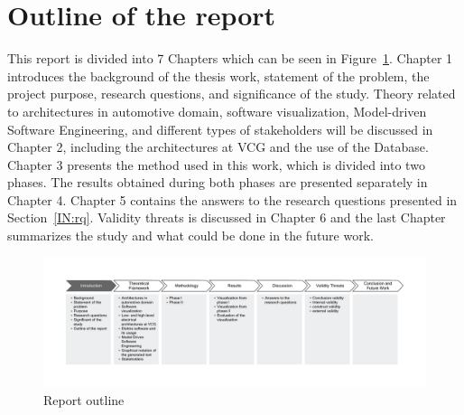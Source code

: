 \section{Outline of the report} \label{Outline_ref}
This report is divided into 7 Chapters which can be seen in Figure~\ref{fig:report_outline}. Chapter 1 introduces the background of the thesis work, statement of the problem, the project purpose, research questions, and significance of the study. Theory related to architectures in automotive domain, software visualization, Model-driven Software Engineering, and different types of stakeholders will be discussed in Chapter 2, including the architectures at VCG and the use of the Database. Chapter 3 presents the method used in this work, which is divided into two phases. The results obtained during both phases are presented separately in Chapter 4. Chapter 5 contains the answers to the research questions presented in Section~\ref{IN:rq}. Validity threats is discussed in Chapter 6 and the last Chapter summarizes the study and what could be done in the future work.

\begin{figure}[H]
\centering
\captionsetup{justification=centering}
\vspace{0cm}%
\includegraphics[width=1\linewidth]{figure/misc/report_outline.pdf}
\caption{Report outline}
\label{fig:report_outline}
\end{figure}